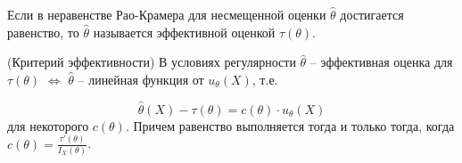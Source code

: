\begin{definition}
Если в неравенстве Рао-Крамера для несмещенной оценки $\displaystyle \hat{\theta }$ достигается равенство, то $\displaystyle \hat{\theta }$ называется эффективной оценкой $\displaystyle \tau ( \theta )$.
\end{definition}
\begin{theorem}
(Критерий эффективности) В условиях регулярности $\displaystyle \hat{\theta }$ -- эффективная оценка для $\displaystyle \tau ( \theta )$ $\displaystyle \Leftrightarrow $ $\displaystyle \hat{\theta }$ -- линейная функция от $\displaystyle u_{\theta }( X)$, т.е.


\begin{equation*}
\hat{\theta }( X) -\tau ( \theta ) =c( \theta ) \cdotp u_{\theta }( X)
\end{equation*}
для некоторого $\displaystyle c( \theta )$. Причем равенство выполняется тогда и только тогда, когда $\displaystyle c( \theta ) =\frac{\tau '( \theta )}{I_{X}( \theta )}$.
\end{theorem}
